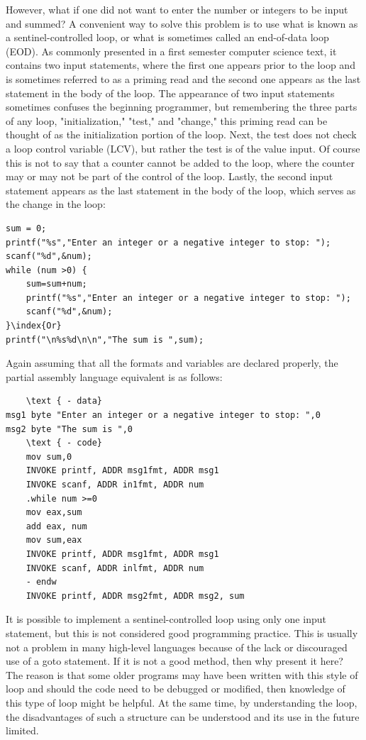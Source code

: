 \documentclass[10pt]{book}
\begin{document}
However, what if one did not want to enter the number or integers to be input and summed? A convenient way to solve this problem is to use what is known as a sentinel-controlled loop, or what is sometimes called an end-of-data loop (EOD). As commonly presented in a first semester computer science text, it contains two input statements, where the first one appears prior to the loop and is sometimes referred to as a priming read and the second one appears as the last statement in the body of the loop. The appearance of two input statements sometimes confuses the beginning programmer, but remembering the three parts of any loop, "initialization," "test," and "change," this priming read can be thought of as the initialization portion of the loop. Next, the test does not check a loop control variable (LCV), but rather the test is of the value input. Of course this is not to say that a counter cannot be added to the loop, where the counter may or may not be part of the control of the loop. Lastly, the second input statement appears as the last statement in the body of the loop, which serves as the change in the loop:


\begin{verbatim}
sum = 0;
printf("%s","Enter an integer or a negative integer to stop: ");
scanf("%d",&num);
while (num >0) {
    sum=sum+num;
    printf("%s","Enter an integer or a negative integer to stop: ");
    scanf("%d",&num);
}\index{Or}
printf("\n%s%d\n\n","The sum is ",sum);
\end{verbatim}

Again assuming that all the formats and variables are declared properly, the partial assembly language equivalent is as follows:

\begin{verbatim}
    \text { - data}
msg1 byte "Enter an integer or a negative integer to stop: ",0
msg2 byte "The sum is ",0
    \text { - code}
    mov sum,0
    INVOKE printf, ADDR msg1fmt, ADDR msg1
    INVOKE scanf, ADDR in1fmt, ADDR num
    .while num >=0
    mov eax,sum
    add eax, num
    mov sum,eax
    INVOKE printf, ADDR msg1fmt, ADDR msg1
    INVOKE scanf, ADDR inlfmt, ADDR num
    - endw
    INVOKE printf, ADDR msg2fmt, ADDR msg2, sum
\end{verbatim}

It is possible to implement a sentinel-controlled loop using only one input statement, but this is not considered good programming practice. This is usually not a problem in many high-level languages because of the lack or discouraged use of a goto statement. If it is not a good method, then why present it here? The reason is that some older programs may have been written with this style of loop and should the code need to be debugged or modified, then knowledge of this type of loop might be helpful. At the same time, by understanding the loop, the disadvantages of such a structure can be understood and its use in the future limited.
\end{document}
